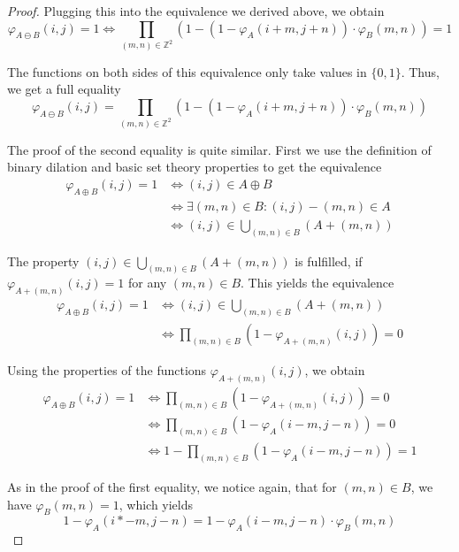 \documentclass[a4paper,12pt]{article}
\theoremstyle{plain}
\theoremstyle{definition}
\theoremstyle{remark}
\begin{document}
\begin{proof}
	Plugging this into the equivalence we derived above, we obtain
	\begin{equation*}
		\varphi_{A \ominus B}(i, j) = 1 \Leftrightarrow \prod_{(m, n) \in \mathbb{Z}^2} ( 1 - ( 1 - \varphi_A(i + m, j + n) ) \cdot \varphi_B(m, n) ) = 1
	\end{equation*}
	
	The functions on both sides of this equivalence only take values in $\{ 0, 1 \}$. Thus, we get a full equality
	\begin{equation*}
		\varphi_{A \ominus B}(i, j) = \prod_{(m, n) \in \mathbb{Z}^2} ( 1 - ( 1 - \varphi_A(i + m, j + n) ) \cdot \varphi_B(m, n) )
	\end{equation*}
	
	The proof of the second equality is quite similar. First we use the definition of binary dilation and basic set theory properties to get the equivalence
	\begin{align*}
		\varphi_{A \oplus B}(i, j) = 1 &\Leftrightarrow (i, j) \in A \oplus B \\
		&\Leftrightarrow \exists (m, n) \in B: (i, j) - (m, n) \in A \\
		&\Leftrightarrow (i, j) \in \bigcup_{(m, n) \in B} ( A + (m, n) )
	\end{align*}
	
	The property $(i, j) \in \bigcup_{(m, n) \in B} ( A + (m, n) )$ is fulfilled, if $\varphi_{A + (m, n)}(i, j) = 1$ for any $(m, n) \in B$. This yields the equivalence
	\begin{align*}
		\varphi_{A \oplus B}(i, j) = 1 &\Leftrightarrow (i, j) \in \bigcup_{(m, n) \in B} ( A + (m, n) ) \\
		&\Leftrightarrow \prod_{(m, n) \in B} ( 1 - \varphi_{A + (m, n)}(i, j) ) = 0
	\end{align*}
	
	Using the properties of the functions $\varphi_{A + (m, n)}(i, j)$, we obtain
	\begin{align*}
		\varphi_{A \oplus B}(i, j) = 1 &\Leftrightarrow \prod_{(m, n) \in B} ( 1 - \varphi_{A + (m, n)}(i, j) ) = 0 \\
		&\Leftrightarrow \prod_{(m, n) \in B} ( 1 - \varphi_A(i - m, j - n) ) = 0 \\
		&\Leftrightarrow 1 - \prod_{(m, n) \in B} ( 1 - \varphi_A(i - m, j - n) ) = 1
	\end{align*}
	
	As in the proof of the first equality, we notice again, that for $(m, n) \in B$, we have $\varphi_B(m, n) = 1$, which yields
	\begin{equation*}
		1 - \varphi_A(i *- m, j - n) = 1 - \varphi_A(i - m, j - n) \cdot \varphi_B(m, n)
	\end{equation*}
	

\end{proof}
\end{document}
